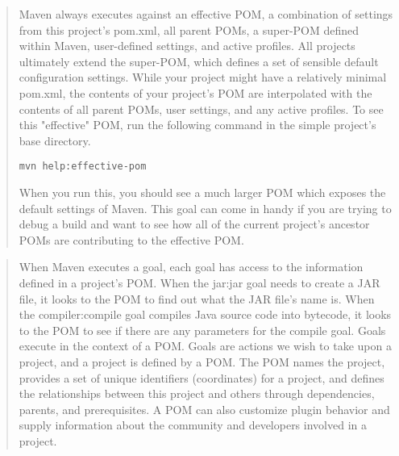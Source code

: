 \documentclass[12pt]{extarticle}
\theoremstyle{plain}
\theoremstyle{Definition}
\theoremstyle{Definition}
\theoremstyle{plain}
\begin{document}
		\begin{quotation}
			Maven always executes against an effective POM, a combination of settings from this project’s pom.xml, all parent POMs, a super-POM defined within Maven, user-defined settings, and active profiles. All projects ultimately extend the super-POM, which defines a set of sensible default configuration settings. While your project might have a relatively minimal pom.xml, the contents of your project’s POM are interpolated with the contents of all parent POMs, user settings, and any active profiles. To see this "effective" POM, run the following command in the simple project’s base directory.
			\begin{center}
				\verb|mvn help:effective-pom| 
			\end{center} 				
			When you run this, you should see a much larger POM which exposes the default settings of Maven. This goal can come in handy if you are trying to debug a build and want to see how all of the current project’s ancestor POMs are contributing to the effective POM.
		\end{quotation}			
		\begin{quotation}
			When Maven executes a goal, each goal has access to the information defined in a project’s POM. When the jar:jar goal needs to create a JAR file, it looks to the POM to find out what the JAR file’s name is. When the compiler:compile goal compiles Java source code into bytecode, it looks to the POM to see if there are any parameters for the compile goal. Goals execute in the context of a POM. Goals are actions we wish to take upon a project, and a project is defined by a POM. The POM names the project, provides a set of unique identifiers (coordinates) for a project, and defines the relationships between this project and others through dependencies, parents, and prerequisites. A POM can also customize plugin behavior and supply information about the community and developers involved in a project.
		\end{quotation}
\end{document}
